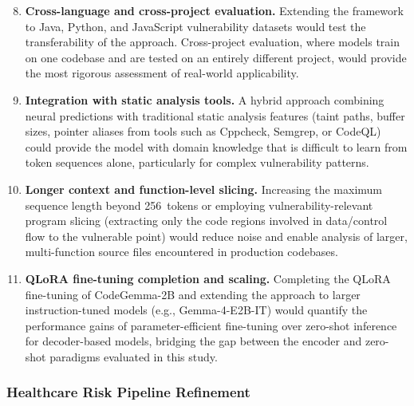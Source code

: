 \documentclass[conference]{IEEEtran}
\begin{document}
\begin{enumerate}
    \setcounter{enumi}{7}
    \item \textbf{Cross-language and cross-project evaluation.}
          Extending the framework to Java, Python, and JavaScript
          vulnerability datasets would test the transferability of the
          approach.  Cross-project evaluation, where models train on one
          codebase and are tested on an entirely different project, would
          provide the most rigorous assessment of real-world applicability.

    \item \textbf{Integration with static analysis tools.}
          A hybrid approach combining neural predictions with traditional
          static analysis features (taint paths, buffer sizes, pointer
          aliases from tools such as Cppcheck, Semgrep, or CodeQL) could
          provide the model with domain knowledge that is difficult to learn
          from token sequences alone, particularly for complex
          vulnerability patterns.

    \item \textbf{Longer context and function-level slicing.}
          Increasing the maximum sequence length beyond 256~tokens or
          employing vulnerability-relevant program slicing (extracting only
          the code regions involved in data/control flow to the vulnerable
          point) would reduce noise and enable analysis of larger,
          multi-function source files encountered in production codebases.

    \item \textbf{QLoRA fine-tuning completion and scaling.}
          Completing the QLoRA fine-tuning of CodeGemma-2B and extending the
          approach to larger instruction-tuned models (e.g., Gemma-4-E2B-IT)
          would quantify the performance gains of parameter-efficient
          fine-tuning over zero-shot inference for decoder-based models,
          bridging the gap between the encoder and zero-shot paradigms
          evaluated in this study.
\end{enumerate}

\subsubsection{Healthcare Risk Pipeline Refinement}
\end{document}
